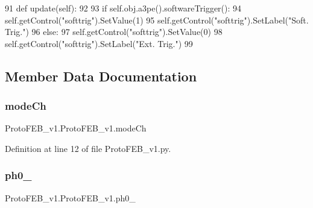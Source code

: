\begin{DoxyCode}
91     \textcolor{keyword}{def }update(self):
92 
93         \textcolor{keywordflow}{if} self.obj.a3pe().softwareTrigger():
94             self.getControl(\textcolor{stringliteral}{"softtrig"}).SetValue(1)
95             self.getControl(\textcolor{stringliteral}{"softtrig"}).SetLabel(\textcolor{stringliteral}{"Soft. Trig."})
96         \textcolor{keywordflow}{else}:
97             self.getControl(\textcolor{stringliteral}{"softtrig"}).SetValue(0)
98             self.getControl(\textcolor{stringliteral}{"softtrig"}).SetLabel(\textcolor{stringliteral}{"Ext. Trig."})
99 
\end{DoxyCode}


\subsection{Member Data Documentation}
\mbox{\label{classProtoFEB__v1_1_1ProtoFEB__v1_acd03f62f5c3c9829f4f0c7407735e352}} 
\subsubsection{\texorpdfstring{mode\+Ch}{modeCh}}
{\footnotesize\ttfamily Proto\+F\+E\+B\+\_\+v1.\+Proto\+F\+E\+B\+\_\+v1.\+mode\+Ch}



Definition at line 12 of file Proto\+F\+E\+B\+\_\+v1.\+py.

\mbox{\label{classProtoFEB__v1_1_1ProtoFEB__v1_ad56c4acc735e7ed9adb2ceaae9b49967}} 
\subsubsection{\texorpdfstring{ph0\+\_}{ph0\_0}}
{\footnotesize\ttfamily Proto\+F\+E\+B\+\_\+v1.\+Proto\+F\+E\+B\+\_\+v1.\+ph0\+\_}



